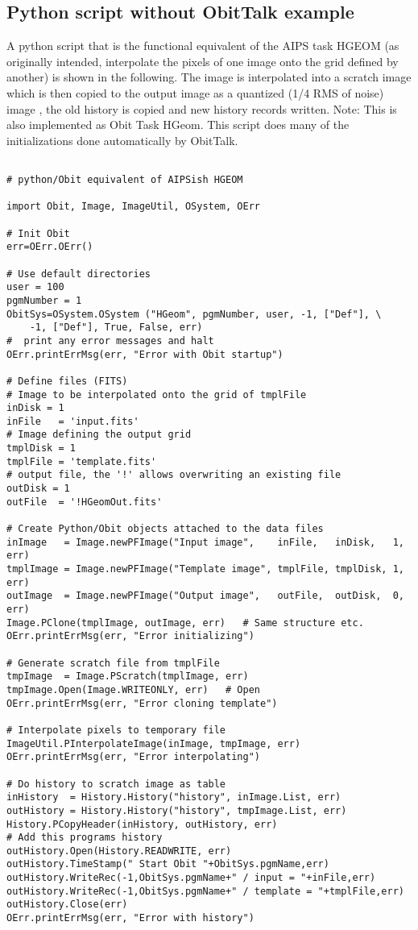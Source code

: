 \documentclass[11pt]{report}
\begin{document}
\subsection{Python script without ObitTalk example}
A python script that is the functional equivalent of the AIPS task
HGEOM (as originally intended, interpolate the pixels of one image
onto the grid defined by another) is shown in the following.
The image is interpolated into a scratch image which is then copied to
the output image as a quantized (1/4 RMS of noise) image , the old
history is copied and new history records written.
Note: This is also implemented as Obit Task HGeom.
This script does many of the initializations done automatically by ObitTalk.
\begin{verbatim}

# python/Obit equivalent of AIPSish HGEOM

import Obit, Image, ImageUtil, OSystem, OErr

# Init Obit
err=OErr.OErr()

# Use default directories
user = 100
pgmNumber = 1
ObitSys=OSystem.OSystem ("HGeom", pgmNumber, user, -1, ["Def"], \
    -1, ["Def"], True, False, err)
#  print any error messages and halt
OErr.printErrMsg(err, "Error with Obit startup")

# Define files (FITS)
# Image to be interpolated onto the grid of tmplFile
inDisk = 1
inFile   = 'input.fits'     
# Image defining the output grid
tmplDisk = 1
tmplFile = 'template.fits'
# output file, the '!' allows overwriting an existing file
outDisk = 1
outFile  = '!HGeomOut.fits'

# Create Python/Obit objects attached to the data files
inImage   = Image.newPFImage("Input image",    inFile,   inDisk,   1, err)
tmplImage = Image.newPFImage("Template image", tmplFile, tmplDisk, 1, err)
outImage  = Image.newPFImage("Output image",   outFile,  outDisk,  0, err)
Image.PClone(tmplImage, outImage, err)   # Same structure etc.
OErr.printErrMsg(err, "Error initializing")

# Generate scratch file from tmplFile
tmpImage  = Image.PScratch(tmplImage, err)
tmpImage.Open(Image.WRITEONLY, err)   # Open
OErr.printErrMsg(err, "Error cloning template")

# Interpolate pixels to temporary file
ImageUtil.PInterpolateImage(inImage, tmpImage, err)
OErr.printErrMsg(err, "Error interpolating")

# Do history to scratch image as table
inHistory  = History.History("history", inImage.List, err)
outHistory = History.History("history", tmpImage.List, err)
History.PCopyHeader(inHistory, outHistory, err)
# Add this programs history
outHistory.Open(History.READWRITE, err)
outHistory.TimeStamp(" Start Obit "+ObitSys.pgmName,err)
outHistory.WriteRec(-1,ObitSys.pgmName+" / input = "+inFile,err)
outHistory.WriteRec(-1,ObitSys.pgmName+" / template = "+tmplFile,err)
outHistory.Close(err)
OErr.printErrMsg(err, "Error with history")


\end{verbatim}
\end{document}
